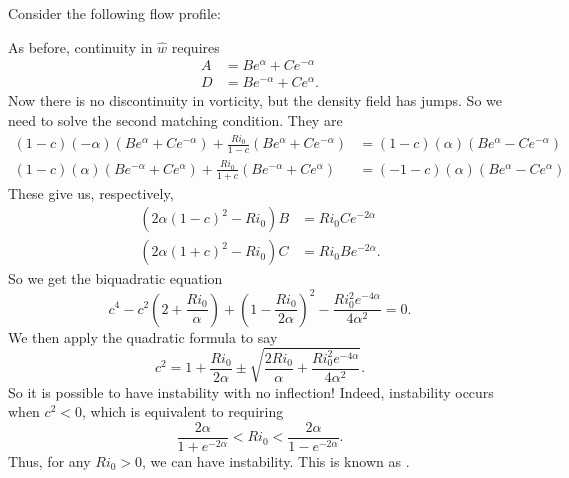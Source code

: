 \documentclass[a4paper]{article}
\begin{document}
Consider the following flow profile:
\begin{center}
\end{center}
As before, continuity in $\hat{w}$ requires
\begin{align*}
  A &= Be^\alpha + Ce^{-\alpha}\\
  D &= Be^{-\alpha} + Ce^{\alpha}.
\end{align*}
Now there is no discontinuity in vorticity, but the density field has jumps. So we need to solve the second matching condition. They are
\begin{align*}
  (1 - c) (-\alpha) (Be^\alpha + C e^{-\alpha}) + \frac{Ri_0}{1 - c} (B e^\alpha + Ce^{-\alpha}) &= (1 - c)(\alpha) (Be^\alpha - C e^{-\alpha})\\
  (1 - c)(\alpha) (Be^{-\alpha} + Ce^\alpha) + \frac{Ri_0}{1 + c} (B e^{-\alpha} + C e^\alpha) &= (-1 - c)(\alpha)(Be^\alpha - Ce^\alpha)
\end{align*}
These give us, respectively,
\begin{align*}
  (2\alpha(1 - c)^2 - Ri_0)B &= Ri_0 Ce^{-2\alpha}\\
  (2\alpha(1 + c)^2 - Ri_0)C &= Ri_0 Be^{-2\alpha}.
\end{align*}
So we get the biquadratic equation
\[
  c^4 - c^2 \left(2 + \frac{Ri_0}{\alpha}\right) + \left(1 - \frac{Ri_0}{2\alpha}\right)^2 - \frac{Ri_0^2 e^{-4\alpha}}{4\alpha^2} = 0.
\]
We then apply the quadratic formula to say
\[
  c^2 = 1 + \frac{Ri_0}{2\alpha} \pm \sqrt{\frac{2Ri_0}{\alpha} + \frac{Ri_0^2 e^{-4\alpha}}{4\alpha^2}}.
\]
So it is possible to have instability with no inflection! Indeed, instability occurs when $c^2 < 0$, which is equivalent to requiring
\[
  \frac{2\alpha}{1 + e^{-2\alpha}} < Ri_0 < \frac{2\alpha}{1 - e^{-2\alpha}}.
\]
Thus, for any $Ri_0 > 0$, we can have instability. This is known as .
\end{document}
